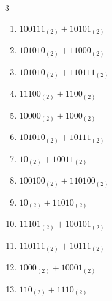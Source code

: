 \begin{multicols}{3}
\begin{enumerate}

  \item $100111_{(2)} + 10101_{(2)}$


  \item $101010_{(2)} + 11000_{(2)}$


  \item $101010_{(2)} + 110111_{(2)}$


  \item $11100_{(2)} + 1100_{(2)}$


  \item $10000_{(2)} + 1000_{(2)}$


  \item $101010_{(2)} + 10111_{(2)}$


  \item $10_{(2)} + 10011_{(2)}$


  \item $100100_{(2)} + 110100_{(2)}$


  \item $10_{(2)} + 11010_{(2)}$


\columnbreak %

  \item $11101_{(2)} + 100101_{(2)}$


  \item $110111_{(2)} + 10111_{(2)}$


  \item $1000_{(2)} + 10001_{(2)}$


  \item $110_{(2)} + 1110_{(2)}$



\end{enumerate}
\end{multicols}
